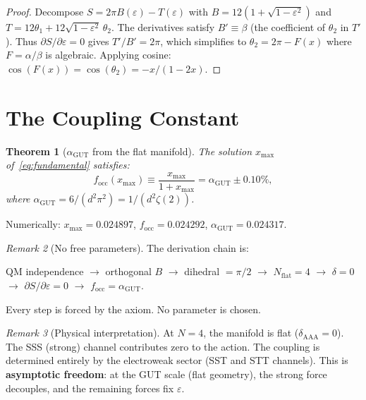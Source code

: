 \documentclass[12pt]{article}
\newtheorem{theorem}{Theorem}[section]
\theoremstyle{definition}
\theoremstyle{remark}
\newtheorem{remark}[theorem]{Remark}
\newcommand{\agut}{\alpha_{\mathrm{GUT}}}
\newcommand{\focc}{f_{\mathrm{occ}}}
\begin{document}
\begin{proof}
Decompose $S = 2\pi B(\varepsilon) - T(\varepsilon)$ with
$B = 12(1+\sqrt{1-\varepsilon^2})$ and
$T = 12\theta_1 + 12\sqrt{1-\varepsilon^2}\,\theta_2$.
The derivatives satisfy $B' \equiv \beta$ (the coefficient of $\theta_2$ in $T'$).
Thus $\partial S/\partial\varepsilon = 0$ gives $T'/B' = 2\pi$,
which simplifies to $\theta_2 = 2\pi - F(x)$ where $F = \alpha/\beta$ is algebraic.
Applying cosine: $\cos(F(x)) = \cos(\theta_2) = -x/(1-2x)$.
\end{proof}

\section{The Coupling Constant}
\label{sec:coupling}

\begin{theorem}[$\agut$ from the flat manifold]
\label{thm:alpha}
The solution $x_{\max}$ of~\eqref{eq:fundamental} satisfies:
\begin{equation}
\focc(x_{\max}) \equiv \frac{x_{\max}}{1+x_{\max}} = \agut \pm 0.10\%,
\end{equation}
where $\agut = 6/(d^2\pi^2) = 1/(d^2\zeta(2))$.
\end{theorem}

Numerically: $x_{\max} = 0.024897$, $\focc = 0.024292$, $\agut = 0.024317$.

\begin{remark}[No free parameters]
The derivation chain is:
\begin{center}
QM independence $\to$ orthogonal $B$ $\to$ dihedral $= \pi/2$
$\to$ $N_{\text{flat}}=4$ $\to$ $\delta=0$ $\to$
$\partial S/\partial\varepsilon=0$ $\to$ $\focc=\agut$.
\end{center}
Every step is forced by the axiom. No parameter is chosen.
\end{remark}

\begin{remark}[Physical interpretation]
At $N=4$, the manifold is flat ($\delta_{\text{AAA}}=0$). The SSS (strong)
channel contributes zero to the action. The coupling is determined
entirely by the electroweak sector (SST and STT channels). This is
\textbf{asymptotic freedom}: at the GUT scale (flat geometry),
the strong force decouples, and the remaining forces fix $\varepsilon$.
\end{remark}
\end{document}
